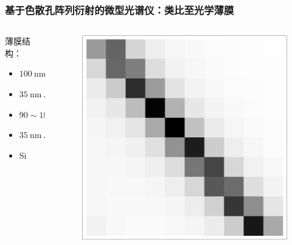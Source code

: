 \begin{frame}[c]
    \frametitle{基于色散孔阵列衍射的微型光谱仪：类比至光学薄膜}
    \begin{columns}
        \begin{column}{.4\textwidth}
            薄膜结构：\begin{itemize}
                \item $100\ \mathrm{nm\ SiO_2}$
                \item $35\ \mathrm{nm\ Ag}$
                \item $90\sim 180\ \mathrm{nm\ SiO_2}$
                \item $35\ \mathrm{nm\ Ag}$
                \item $\mathrm{Si}$
            \end{itemize}
        \end{column}
        \begin{column}{.6\textwidth}
            \begin{figure}[!htb] %
                \centering %
                \includegraphics[width=.8\textwidth]{figures/Miniature spectrometer based on diffraction in a dispersive hole array_5.pdf} %
            \end{figure}
        \end{column}
    \end{columns}
    \begin{figure}[!htb] %
        \centering %

\end{figure}
\end{frame}
